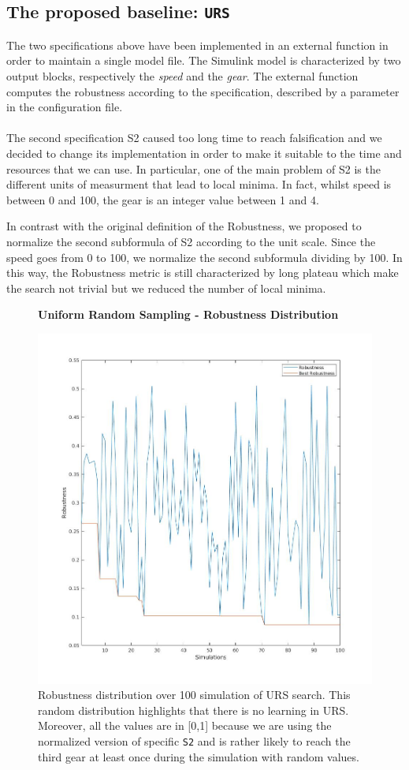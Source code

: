 \documentclass[11pt]{article}
\begin{document}
\subsection{The proposed baseline: \texttt{URS}}
The two specifications above have been implemented in an external function in order to maintain a single model file. The Simulink model is characterized by two output blocks, respectively the \textit{speed} and the \textit{gear}. The external function computes the robustness according to the specification, described by a parameter in the configuration file.
\\ \\
The second specification S2 caused too long time to reach falsification and we decided to change its implementation in order to make it suitable to the time and resources that we can use. In particular, one of the main problem of S2 is the different units of measurment that lead to local minima. In fact, whilst speed is between 0 and 100, the gear is an integer value between 1 and 4.

In contrast with the original definition of the Robustness, we proposed to normalize the second subformula of S2 according to the unit scale. Since the speed goes from 0 to 100, we normalize the second subformula dividing by 100. In this way, the Robustness metric is still characterized by long plateau which make the search not trivial but we reduced the number of local minima.

\begin{figure}[h]
    \centering
    \textbf{Uniform Random Sampling - Robustness Distribution}\par
    \includegraphics[width=0.5\linewidth]{img/urs_rob_distr.jpg}
    \caption{Robustness distribution over 100 simulation of URS search. This random distribution highlights that there is no learning in URS. Moreover, all the values are in [0,1] because we are using the normalized version of specific \texttt{S2} and is rather likely to reach the third gear at least once during the simulation with random values.}
\end{figure}
\end{document}
